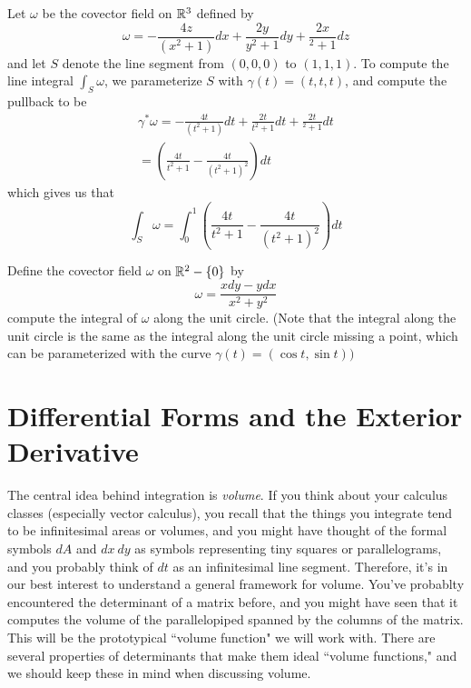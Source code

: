 \begin{exmp}
Let $\omega$ be the covector field on $\mathbb{R}^3$ defined by
$$\omega = -\frac{4z}{(x^2 + 1)} dx + \frac{2y}{y^2 + 1}dy + \frac{2x}{^2 + 1} dz $$
and let $S$ denote the line segment from $(0,0,0)$ to $(1,1,1)$. To compute
the line integral $\int_S \omega$, we parameterize $S$ with $\gamma(t) = (t,t,t)$,
and compute the pullback to be
\begin{align*}
\gamma^*\omega = -\frac{4t}{(t^2 + 1)} dt + \frac{2t}{t^2 + 1}dt + \frac{2t}{^2 + 1} dt \\
= \left( \frac{4t}{t^2 + 1} - \frac{4t}{(t^2 + 1)^2} \right) dt
\end{align*}
which gives us that
$$\int_S \omega = \int_0^1 \left( \frac{4t}{t^2 + 1} - \frac{4t}{(t^2 + 1)^2} \right) dt$$
\end{exmp}
%
\begin{exer}
Define the covector field $\omega$ on $\mathbb{R}^2 - \left\lbrace 0 \right\rbrace$ by
$$\omega = \frac{x dy - ydx}{x^2 + y^2} $$
compute the integral of $\omega$ along the unit circle. (Note that the integral
along the unit circle is the same as the integral along the unit circle
missing a point, which can be parameterized with the curve
$\gamma(t) = (\cos t, \sin t))$
\end{exer}
%
\section{Differential Forms and the Exterior Derivative}
%
The central idea behind integration is \emph{volume}. If you think about your
calculus classes (especially vector calculus), you recall that the things
you integrate tend to be infinitesimal areas or volumes, and you might have
thought of the formal symbols $dA$ and $dx~dy$ as symbols representing
tiny squares or parallelograms, and you probably think of $dt$ as an
infinitesimal line segment. Therefore, it's in our best interest to
understand a general framework for volume. You've probablty encountered
the determinant of a matrix before, and you might have seen that it computes
the volume of the parallelopiped spanned by the columns of the matrix. This
will be the prototypical ``volume function" we will work with. There are
several properties of determinants that make them ideal ``volume functions,"
and we should keep these in mind when discussing volume.  \\

